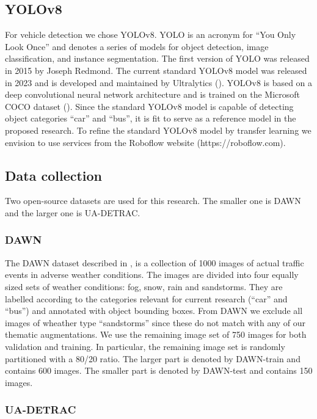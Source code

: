 \documentclass[]{article}
\begin{document}
\subsection{YOLOv8}

	For vehicle detection we chose YOLO{\small v8}. YOLO is an acronym for ``You Only Look Once'' and denotes a series of models for object detection, image classification, and instance segmentation. The first version of YOLO was released in 2015 by Joseph Redmond. The current standard YOLO{\small v8} model was released in 2023 and is developed and maintained by Ultralytics (\cite{yolov8_ultralytics}). YOLO{\small v8} is based on a deep convolutional neural network architecture and is trained on the Microsoft COCO dataset (\cite{linMicrosoftCOCOCommon2015a}). Since the standard YOLO{\small v8} model is capable of detecting object categories ``car'' and ``bus'', it is fit to serve as a reference model in the proposed research. To refine the standard YOLO{\small v8}  model by transfer learning we envision to use services from the Roboflow website (https://roboflow.com).  

\subsection{Data collection}

	Two open-source datasets are used for this research. The smaller one is DAWN and the larger one is UA-DETRAC.

\subsubsection{DAWN}

	The DAWN dataset described in \cite{bw1x-yh39-20}, is a collection of 1000 images of actual traffic events in adverse weather conditions. The images are divided into four equally sized sets of weather conditions: fog, snow, rain and sandstorms. They are labelled according to the categories relevant for current research (``car'' and ``bus'') and annotated with object bounding boxes. From DAWN we exclude all images of wheather type ``sandstorms'' since these do not match with any of our thematic augmentations. We use the remaining image set of 750 images for both validation and training. In particular, the remaining image set is randomly partitioned with a 80/20 ratio. The larger part is denoted by DAWN-train and contains 600 images. The smaller part is denoted by DAWN-test and contains 150 images.

\subsubsection{UA-DETRAC}
\end{document}
